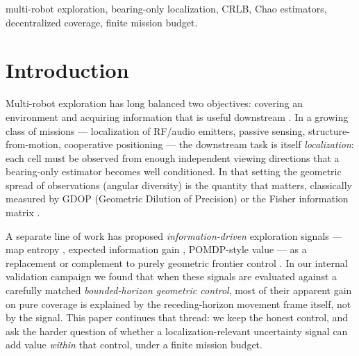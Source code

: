 \documentclass[journal]{IEEEtran}
\newcommand{\CU}{Coverage-U}
\begin{document}
\begin{abstract}
sparse-obstacle environments, and specific to the budget-limited regime: in
unbounded episodes final localization quality is at parity. We interpret the
results as evidence that config-count richness is a reliable state witness
that becomes an operating lever precisely when mission time --- not distance
--- is the scarce resource. A centralized perfect oracle (E5, $n = 40\times2$)
regresses both metrics, and the local-vs-global ladder isolates why: the same
config-count signal reduces the residual bound $\sim$+30\% when scored locally
and regresses when the same under-set is fused globally. Re-running both
oracle signals in \CU's{} own local movement frame (E5-CORRECTED, $n=40$)
confirms the effect is the \emph{signal}, not the oracle's global movement
frame --- evidence that \textbf{locality, not signal strength}, is what makes
the accuracy/coverage trade-off attainable.
\end{abstract}

\begin{IEEEkeywords}
multi-robot exploration, bearing-only localization, CRLB, Chao estimators,
decentralized coverage, finite mission budget.
\end{IEEEkeywords}


\section{Introduction}
Multi-robot exploration has long balanced two objectives: covering an
environment and acquiring information that is useful downstream
\cite{Yamauchi1997, Burgard2005, Lauri2023}. In a growing class of missions ---
localization of RF/audio emitters, passive sensing, structure-from-motion,
cooperative positioning --- the downstream task is itself
\emph{localization}: each cell must be observed from enough independent viewing
directions that a bearing-only estimator becomes well conditioned. In that
setting the geometric spread of observations (angular diversity) is the
quantity that matters, classically measured by GDOP (Geometric Dilution of
Precision) or the Fisher information matrix \cite{Yarlagadda2000, Bishop2004}.

A separate line of work has proposed \emph{information-driven} exploration
signals --- map entropy \cite{Bourgault2002, Stachniss2005}, expected
information gain \cite{Julian2014, Charrow2015}, POMDP-style value
\cite{Bai2014} --- as a replacement or complement to purely geometric frontier
control \cite{Yamauchi1997}. In our internal validation campaign we found that
when these signals are evaluated against a carefully matched
\emph{bounded-horizon geometric control}, most of their apparent gain on pure
coverage is explained by the receding-horizon movement frame itself, not by
the signal. This paper continues that thread: we keep the honest control, and
ask the harder question of whether a localization-relevant uncertainty signal
can add value \emph{within} that control, under a finite mission budget.
\end{document}
